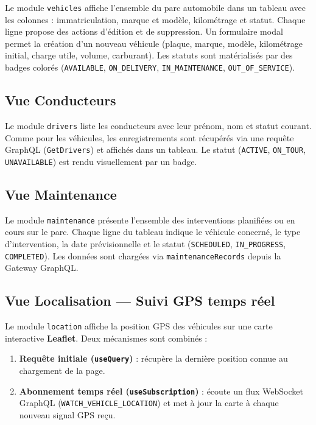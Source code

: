 \documentclass[12pt,a4paper]{article}
\begin{document}
Le module \texttt{vehicles} affiche l'ensemble du parc automobile dans un tableau avec les colonnes : immatriculation, marque et mod\`{e}le, kilom\'{e}trage et statut. Chaque ligne propose des actions d'\'{e}dition et de suppression. Un formulaire modal permet la cr\'{e}ation d'un nouveau v\'{e}hicule (plaque, marque, mod\`{e}le, kilom\'{e}trage initial, charge utile, volume, carburant). Les statuts sont mat\'{e}rialis\'{e}s par des badges color\'{e}s (\texttt{AVAILABLE}, \texttt{ON\_DELIVERY}, \texttt{IN\_MAINTENANCE}, \texttt{OUT\_OF\_SERVICE}).

\subsection{Vue Conducteurs}

Le module \texttt{drivers} liste les conducteurs avec leur pr\'{e}nom, nom et statut courant. Comme pour les v\'{e}hicules, les enregistrements sont r\'{e}cup\'{e}r\'{e}s via une requ\^{e}te GraphQL (\texttt{GetDrivers}) et affich\'{e}s dans un tableau. Le statut (\texttt{ACTIVE}, \texttt{ON\_TOUR}, \texttt{UNAVAILABLE}) est rendu visuellement par un badge.

\subsection{Vue Maintenance}

Le module \texttt{maintenance} pr\'{e}sente l'ensemble des interventions planifi\'{e}es ou en cours sur le parc. Chaque ligne du tableau indique le v\'{e}hicule concern\'{e}, le type d'intervention, la date pr\'{e}visionnelle et le statut (\texttt{SCHEDULED}, \texttt{IN\_PROGRESS}, \texttt{COMPLETED}). Les donn\'{e}es sont charg\'{e}es via \texttt{maintenanceRecords} depuis la Gateway GraphQL.

\subsection{Vue Localisation --- Suivi GPS temps r\'{e}el}

Le module \texttt{location} affiche la position GPS des v\'{e}hicules sur une carte interactive \textbf{Leaflet}. Deux m\'{e}canismes sont combin\'{e}s :

\begin{enumerate}[leftmargin=*]
  \item \textbf{Requ\^{e}te initiale (\texttt{useQuery})} : r\'{e}cup\`{e}re la derni\`{e}re position connue au chargement de la page.
  \item \textbf{Abonnement temps r\'{e}el (\texttt{useSubscription})} : \'{e}coute un flux WebSocket GraphQL (\texttt{WATCH\_VEHICLE\_LOCATION}) et met \`{a} jour la carte \`{a} chaque nouveau signal GPS re\c{c}u.
\end{enumerate}
\end{document}
